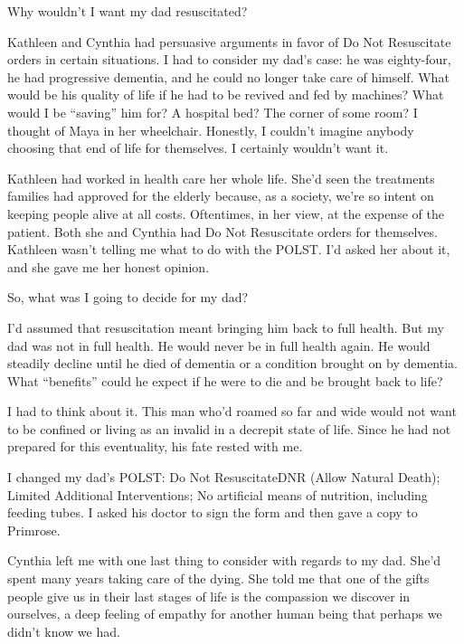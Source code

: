 \documentclass[12pt]{book}
\begin{document}
Why wouldn't I want my dad resuscitated?

Kathleen and Cynthia had persuasive arguments in favor of Do Not Resuscitate orders in certain situations. I had to consider my dad's case: he was eighty-four, he had progressive dementia, and he could no longer take care of himself. What would be his quality of life if he had to be revived and fed by machines? What would I be ``saving'' him for? A hospital bed? The corner of some room? I thought of Maya in her wheelchair. Honestly, I couldn't imagine anybody choosing that end of life for themselves. I certainly wouldn't want it.

Kathleen had worked in health care her whole life. She'd seen the treatments families had approved for the elderly because, as a society, we're so intent on keeping people alive at all costs. Oftentimes, in her view, at the expense of the patient. Both she and Cynthia had Do Not Resuscitate orders for themselves. Kathleen wasn't telling me what to do with the POLST. I'd asked her about it, and she gave me her honest opinion.

So, what was I going to decide for my dad?

I'd assumed that resuscitation meant bringing him back to full health. But my dad was not in full health. He would never be in full health again. He would steadily decline until he died of dementia or a condition brought on by dementia. What ``benefits'' could he expect if he were to die and be brought back to life?

I had to think about it. This man who'd roamed so far and wide would not want to be confined or living as an invalid in a decrepit state of life. Since he had not prepared for this eventuality, his fate rested with me.

I changed my dad's POLST: Do Not Resuscitate\/DNR (Allow Natural Death); Limited Additional Interventions; No artificial means of nutrition, including feeding tubes. I asked his doctor to sign the form and then gave a copy to Primrose.

Cynthia left me with one last thing to consider with regards to my dad. She'd spent many years taking care of the dying. She told me that one of the gifts people give us in their last stages of life is the compassion we discover in ourselves, a deep feeling of empathy for another human being that perhaps we didn't know we had. 


\chapter{}
\end{document}
